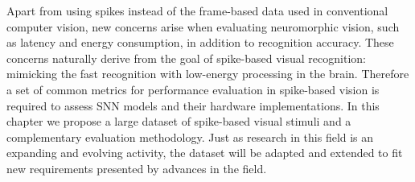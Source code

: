 Apart from using spikes instead of the frame-based data used in conventional computer vision, new concerns arise when evaluating neuromorphic vision, such as latency and energy consumption, in addition to recognition accuracy.
These concerns naturally derive from the goal of spike-based visual recognition: mimicking the fast recognition with low-energy processing in the brain. 
Therefore a set of common metrics for performance evaluation in spike-based vision is required to assess SNN models and their hardware implementations.
In this chapter we propose a large dataset of spike-based visual stimuli and a complementary evaluation methodology.
Just as research in this field is an expanding and evolving activity, the dataset will be adapted and extended to fit new requirements presented by advances in the field.



